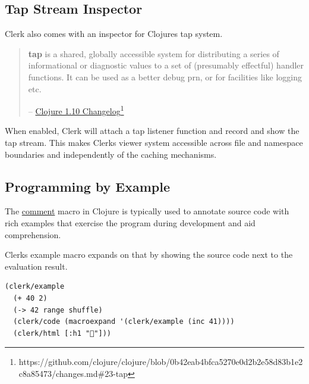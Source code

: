 \documentclass[sigconf,screen]{acmart}
\begin{document}
\hypertarget{tap-stream-inspector}{%
\subsection{Tap Stream Inspector}\label{tap-stream-inspector}}

Clerk also comes with an inspector for Clojure\textquotesingle s tap system.

\begin{quote}
\textbf{tap} is a shared, globally accessible system for distributing a series of informational or diagnostic values to a set of (presumably effectful) handler functions. It can be used as a better debug prn, or for facilities like logging etc.

-- {\href{https://github.com/clojure/clojure/blob/0b42eab4bfca5270e0d2b2e58d83b1e2c8a85473/changes.md\#23-tap}{Clojure 1.10 Changelog}\footnote{https://github.com/clojure/clojure/blob/0b42eab4bfca5270e0d2b2e58d83b1e2c8a85473/changes.md\#23-tap}}
\end{quote}

When enabled, Clerk will attach a tap listener function and record and show the tap stream. This makes Clerk\textquotesingle s viewer system accessible across file and namespace boundaries and independently of the caching mechanisms.

\hypertarget{programming-by-example}{%
\subsection{Programming by Example}\label{programming-by-example}}

The {\href{https://clojuredocs.org/clojure.core/comment}{comment}} macro in Clojure is typically used to annotate source code with rich examples that exercise the program during development and aid comprehension.

Clerk\textquotesingle s example macro expands on that by showing the source code next to the evaluation result.

\begin{minipage}{\linewidth}
\begin{lstlisting}
(clerk/example
  (+ 40 2)
  (-> 42 range shuffle)
  (clerk/code (macroexpand '(clerk/example (inc 41))))
  (clerk/html [:h1 "👋"]))
\end{lstlisting}
\end{minipage}
\end{document}
